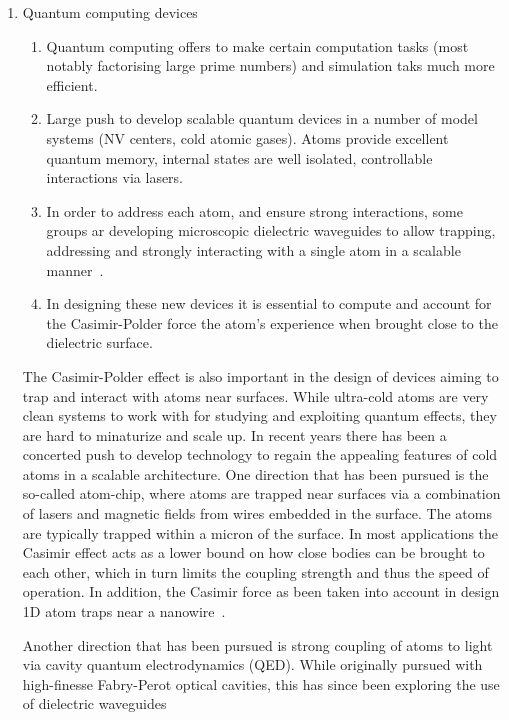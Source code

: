 \begin{enumerate}
\item Quantum computing devices
    \begin{enumerate}
      \item Quantum computing offers to make certain computation tasks (most notably factorising 
        large prime numbers) and simulation taks much more efficient.  
      \item Large push to develop scalable quantum devices in a number of model systems
        (NV centers, cold atomic gases).  Atoms provide excellent quantum memory, internal
        states are well isolated, controllable interactions via lasers.  
      \item In order to address each atom, and ensure strong interactions, some groups 
        ar developing microscopic dielectric waveguides to allow trapping, addressing and strongly interacting with a 
        single atom in a scalable manner~\cite{Alton2011, Hung2013, Goban2014}.  
      \item In designing these new devices it is essential to compute and account for the Casimir-Polder force
        the atom's experience when brought close to the dielectric surface.  
    \end{enumerate}

    The Casimir-Polder effect is also important in the design of devices aiming to trap and interact
    with atoms near surfaces.  While ultra-cold atoms are very clean systems to work with for 
    studying and exploiting quantum effects, they are hard to minaturize and scale up.  In recent
    years there has been a concerted push to develop technology to regain the appealing features 
    of cold atoms in a scalable architecture. 
    One direction that has been pursued is the so-called atom-chip\cite{Folman2000,Schneider2003}, where atoms are 
    trapped near surfaces via a combination of lasers and magnetic fields from wires embedded in
    the surface.  The atoms are typically trapped within a micron of the surface.  
    In most applications the Casimir effect acts as a lower bound on how close bodies can be brought 
    to each other, which in turn limits the coupling strength and thus the speed of operation.  
    In addition, the Casimir force as been taken into account in design 1D atom traps 
    near a nanowire~\cite{Salem2010}.

    Another direction that has been pursued is strong coupling of atoms to light via cavity 
    quantum electrodynamics (QED).  While originally pursued with high-finesse Fabry-Perot optical
    cavities, this has since been exploring the use of dielectric waveguides


\end{enumerate}
